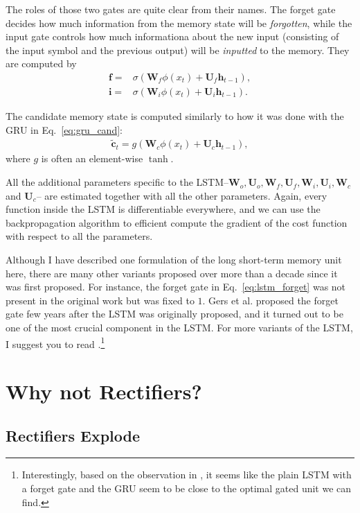 \documentclass{report}
\newcommand{\vect}[1]{\mathbf{#1}}
\newcommand{\matr}[1]{\mathbf{#1}}
\newcommand{\vc}[0]{\vect{c}}
\newcommand{\vh}[0]{\vect{h}}
\newcommand{\vf}[0]{\vect{f}}
\newcommand{\vi}[0]{\vect{i}}
\newcommand{\mW}[0]{\matr{W}}
\newcommand{\mU}[0]{\matr{U}}
\newcommand{\sigmoid}{\sigma}
\begin{document}
The roles of those two gates are quite clear from their names. The forget gate
decides how much information from the memory state will be {\em forgotten},
while the input gate controls how much informationa about the new input
(consisting of the input symbol and the previous output) will be {\em inputted}
to the memory. They are computed by
\begin{align}
    \label{eq:lstm_forget}
    \vf =& \sigmoid(\mW_f \phi(x_t) + \mU_f \vh_{t-1}), 
    \\
    \vi =& \sigmoid(\mW_i \phi(x_t) + \mU_i \vh_{t-1}).
    \nonumber
\end{align}

The candidate memory state is computed similarly to how it was done with the GRU
in Eq.~\eqref{eq:gru_cand}:
\begin{align}
    \tilde{\vc}_t = g(\mW_c \phi(x_t) + \mU_c \vh_{t-1}),
\end{align}
where $g$ is often an element-wise $\tanh$.

All the additional parameters specific to the
LSTM--$\mW_o,\mU_o,\mW_f,\mU_f,\mW_i,\mU_i,\mW_c$ and $\mU_c$-- are estimated
together with all the other parameters. Again, every function inside the LSTM is
differentiable everywhere, and we can use the backpropagation algorithm to
efficient compute the gradient of the cost function with respect to all the
parameters.

Although I have described one formulation of the long short-term memory unit
here, there are many other variants proposed over more than a decade since it
was first proposed. For instance, the forget gate in Eq.~\eqref{eq:lstm_forget}
was not present in the original work \cite{hochreiter1997long} but was fixed to
$1$. Gers et al. \cite{gers2000learning} proposed the forget gate few years
after the LSTM was originally proposed, and it turned out to be one of the most
crucial component in the LSTM. For more variants of the LSTM, I suggest you to
read \cite{greff2015lstm,jozefowicz2015empirical}.\footnote{
    Interestingly, based on the observation in \cite{jozefowicz2015empirical},
    it seems like the plain LSTM with a forget gate and the GRU seem to be close
    to the optimal gated unit we can find. 
}

\section{Why not Rectifiers?}

\subsection{Rectifiers Explode}
\label{sec:rect_explode}
\end{document}
